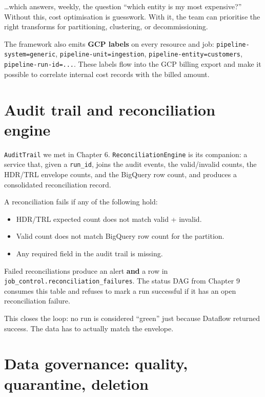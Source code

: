 \documentclass[
  11pt,
  british,
  oneside]{book}
\providecommand{\tightlist}{%
  \setlength{\itemsep}{0pt}\setlength{\parskip}{0pt}}
\begin{document}
\ldots which answers, weekly, the question ``which entity is my most
expensive?'' Without this, cost optimisation is guesswork. With it, the
team can prioritise the right transforms for partitioning, clustering,
or decommissioning.

The framework also emits \textbf{GCP labels} on every resource and job:
\texttt{pipeline-system=generic}, \texttt{pipeline-unit=ingestion},
\texttt{pipeline-entity=customers}, \texttt{pipeline-run-id=...}. These
labels flow into the GCP billing export and make it possible to
correlate internal cost records with the billed amount.

\hypertarget{audit-trail-and-reconciliation-engine}{%
\section{Audit trail and reconciliation
engine}\label{audit-trail-and-reconciliation-engine}}

\texttt{AuditTrail} we met in Chapter 6. \texttt{ReconciliationEngine}
is its companion: a service that, given a \texttt{run\_id}, joins the
audit events, the valid/invalid counts, the HDR/TRL envelope counts, and
the BigQuery row count, and produces a consolidated reconciliation
record.

A reconciliation fails if any of the following hold:

\begin{itemize}
\tightlist
\item
  HDR/TRL expected count does not match valid + invalid.
\item
  Valid count does not match BigQuery row count for the partition.
\item
  Any required field in the audit trail is missing.
\end{itemize}

Failed reconciliations produce an alert \textbf{and} a row in
\texttt{job\_control.reconciliation\_failures}. The status DAG from
Chapter 9 consumes this table and refuses to mark a run successful if it
has an open reconciliation failure.

This closes the loop: no run is considered ``green'' just because
Dataflow returned success. The data has to actually match the envelope.

\hypertarget{data-governance-quality-quarantine-deletion}{%
\section{Data governance: quality, quarantine,
deletion}\label{data-governance-quality-quarantine-deletion}}
\end{document}
